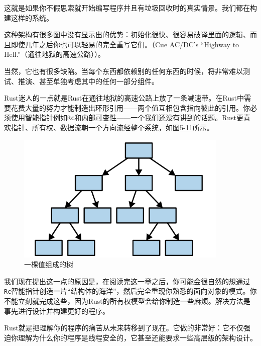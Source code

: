 这就是如果你不假思索就开始编写程序并且有垃圾回收时的真实情景。我们都在构建这样的系统。

这种架构有很多图中没有显示出的优势：初始化很快、很容易破译里面的逻辑、而且即使几年之后你也可以轻易的完全重写它们。（Cue AC/DC’s “Highway to Hell.”（通往地狱的高速公路））。

当然，它也有很多缺陷。当每个东西都依赖别的任何东西的时候，将非常难以测试、推演、甚至单独考虑其中的任何一部分组件。

Rust迷人的一点就是Rust在通往地狱的高速公路上放了一条减速带。在Rust中需要花费大量的努力才能制造出环形引用——两个值互相包含指向彼此的引用。你必须使用智能指针例如\texttt{Rc}和\hyperref[intermut]{内部可变性}——一个我们还没有讲到的话题。Rust更喜欢指针、所有权、数据流朝一个方向流经整个系统，如\hyperref[f5-11]{图5-11}所示。

\begin{figure}[htbp]
    \centering
    \includegraphics[width=0.9\textwidth]{../img/f5-11.png}
    \caption{一棵值组成的树}
    \label{f5-11}
\end{figure}

我们现在提出这一点的原因是，在阅读完这一章之后，你可能会很自然的想通过\texttt{Rc}智能指针创造一片“结构体的海洋”，然后完全重现你熟悉的面向对象的模式。你不能立刻就完成这些，因为Rust的所有权模型会给你制造一些麻烦。解决方法是事先进行设计并构建更好的程序。

Rust就是把理解你的程序的痛苦从未来转移到了现在。它做的非常好：它不仅强迫你理解为什么你的程序是线程安全的，它甚至还能要求一些高层级的架构设计。
